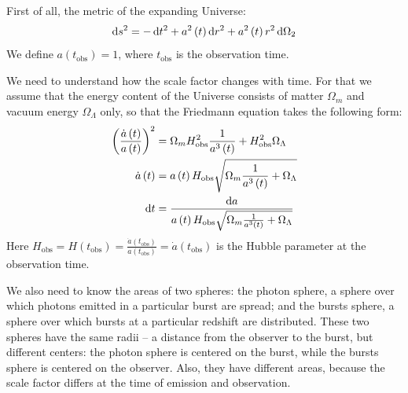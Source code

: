 \documentclass[manuscript]{aastex}
\begin{document}
First of all, the metric of the expanding Universe:
\begin{equation}
\dif s^2 = -\dif t^2 + a^2\left(t\right) \dif r^2 + a^2\left(t\right) r^2 \dif \Omega_2
\end{equation}
We define $a\left(t_\text{obs}\right) = 1$, where $t_\text{obs}$ is
the observation time.

We need to understand how the scale factor changes with time. For that we assume that the energy content of the Universe consists of matter $\Omega_m$ and vacuum energy $\Omega_\Lambda$ only, so that the Friedmann equation takes the following form:
\begin{align*}
\left( \frac{\dot{a}\left(t\right)}{a\left(t\right)} \right)^2 &= \Omega_m H_\text{obs}^2 \frac{1}{a^3\left(t\right)} + H_\text{obs}^2 \Omega_\Lambda \\
\dot{a}\left(t\right) &= a\left(t\right) H_\text{obs} \sqrt{\Omega_m\frac{1}{a^3\left(t\right)} + \Omega_\Lambda} \\
\dif t &= \frac{\dif a}{a\left(t\right) H_\text{obs} \sqrt{\Omega_m\frac{1}{a^3\left(t\right)} + \Omega_\Lambda}}
\end{align*}
Here $H_\text{obs} = H\left(t_\text{obs}\right) = \frac{\dot{a}\left(
  t_\text{obs} \right)}{a\left( t_\text{obs} \right)} = \dot{a}\left(
t_\text{obs} \right)$ is the Hubble parameter at the observation time.

We also need to know the areas of two spheres: the photon sphere, a
sphere over which photons emitted in a particular burst are spread;
and the bursts sphere, a sphere over which bursts at a particular
redshift are distributed. These two spheres have the same radii -- a
distance from the observer to the burst, but different centers: the
photon sphere is centered on the burst, while the bursts sphere is
centered on the observer. Also, they have different areas, because the
scale factor differs at the time of emission and observation.
\end{document}
